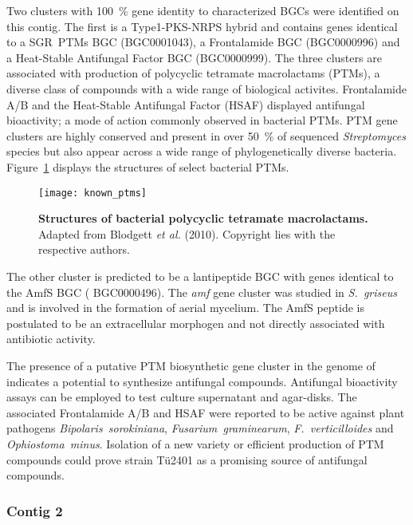 Two clusters with 100~\% gene identity to characterized BGCs were identified on this contig.
The first is a Type1-PKS-NRPS hybrid and contains genes identical to a SGR~PTMs BGC (\textsf{BGC0001043}), a Frontalamide BGC (\textsf{BGC0000996}) and a Heat-Stable Antifungal Factor BGC (\textsf{BGC0000999}).\autocite{Luo2013,Blodgett2010,Yu2007}
The three clusters are associated with production of polycyclic tetramate macrolactams (PTMs), a diverse class of compounds with a wide range of biological activites.\autocite{Schobert2008}
Frontalamide A/B and the Heat-Stable Antifungal Factor (HSAF) displayed antifungal bioactivity; a mode of action commonly observed in bacterial PTMs.\autocite{Blodgett2010,Yu2007,Graupner,JAKOBI1996,Schobert2008}
PTM gene clusters are highly conserved and present in over 50~\% of sequenced \emph{Streptomyces} species but also appear across a wide range of phylogenetically diverse bacteria.\autocite{Blodgett2010}
Figure~\ref{fig:known_ptms} displays the structures of select bacterial PTMs.

\begin{figure}[htbp]
\centering
\texttt{[image: known\_ptms]}
\caption[Structures of bacterial polycyclic tetramate macrolactams]{%
	\textbf{Structures of bacterial polycyclic tetramate macrolactams.} Adapted from Blodgett \emph{et al.} (2010). Copyright lies with the respective authors.}
\label{fig:known_ptms}
\end{figure}

The other cluster is predicted to be a lantipeptide BGC with genes identical to the AmfS BGC (\textsf{ BGC0000496}).
The \emph{amf} gene cluster was studied in \emph{S.~griseus} and is involved in the formation of aerial mycelium.\autocite{Ueda2002a}
The AmfS peptide is postulated to be an extracellular morphogen and not directly associated with antibiotic activity.

The presence of a putative PTM biosynthetic gene cluster in the genome of \tue{} indicates a potential to synthesize antifungal compounds.
Antifungal bioactivity assays can be employed to test culture supernatant and agar-disks.
The associated Frontalamide A/B and HSAF were reported to be active against plant pathogens \emph{Bipolaris~sorokiniana}, \emph{Fusarium~graminearum}, \emph{F.~verticilloides} and \emph{Ophiostoma~minus}.\autocite{Blodgett2010,Yu2007}
Isolation of a new variety or efficient production of PTM compounds could prove strain Tü2401 as a promising source of antifungal compounds.


\subsubsection*{Contig 2}

